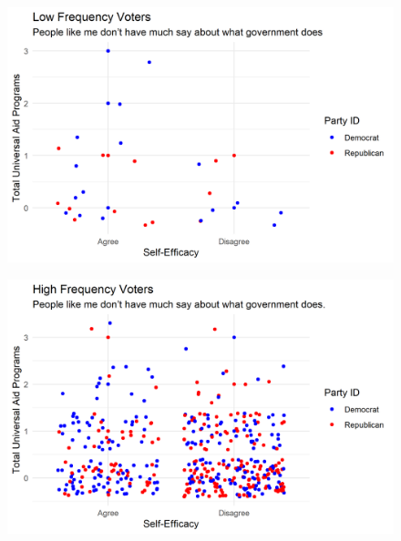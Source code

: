 \documentclass[12pt]{paper}
\begin{document}
\begin{figure}[H]
	\includegraphics[scale=0.7]{Figs/scatter_uni_efficacy_low.png} \centering
	\caption{}
	\label{}
\end{figure}

\begin{figure}[H]
	\includegraphics[scale=0.7]{Figs/scatter_uni_efficacy_high.png} \centering
	\caption{}
	\label{}
\end{figure}
\end{document}

